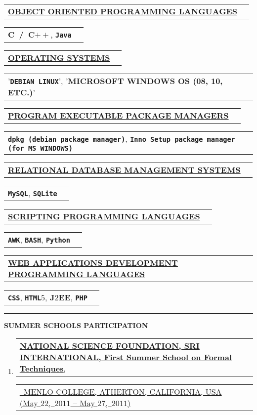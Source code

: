\documentclass[9pt,a4paper]{article} %
\makeatletter
\newcommand{\headerrow}[2]
{\begin{tabular*}{\linewidth}{l@{\extracolsep{\fill}}r}
	#1 &
	#2 \\
\end{tabular*}}
\newcommand{\headerrowONE}[1]{\headerrow{#1}{}}
\newcommand{\cplusplus}{C$++$\xspace}
\newcommand{\java}{\texttt{Java}\xspace}
\newcommand{\css}{\texttt{CSS}\xspace}
\newcommand{\html}{\texttt{HTML$5$}\xspace}
\newcommand{\jtwoee}{J$2$EE\xspace}
\newcommand{\php}{\texttt{PHP}\xspace}
\newcommand{\dpkgmanager}{\texttt{dpkg (debian package manager)}\xspace}
\newcommand{\innosetuppackagemanager}{\texttt{Inno Setup package manager (for MS~WINDOWS)}\xspace}
\newcommand{\AWK}{\texttt{AWK}\xspace}
\newcommand{\bash}{\texttt{BASH}\xspace}
\newcommand{\python}{\texttt{Python}\xspace}
\newcommand{\mysql}{\texttt{MySQL}\xspace}
\newcommand{\sqlite}{\texttt{SQLite}\xspace}
\newcommand{\yerothdebian}{\texttt{DEBIAN LINUX}\xspace}
\newcommand{\cvitemdate}[2]{#1~$#2$\xspace}
\makeatother
\begin{document}
\headerrowONE{\textbf{\underline{OBJECT ORIENTED PROGRAMMING LANGUAGES}}}
\headerrowONE{\textbf{C~/~\cplusplus}, \textbf{\java}}

\vspace{0.3em}


\headerrowONE{\textbf{\underline{OPERATING SYSTEMS}}}
\headerrowONE{'\textbf{\yerothdebian}', '\textbf{MICROSOFT WINDOWS OS (08, 10, ETC.)}'}

\vspace{0.3em}

\headerrowONE{\textbf{\underline{PROGRAM EXECUTABLE PACKAGE MANAGERS}}}
\headerrowONE{\textbf{\dpkgmanager}, \textbf{\innosetuppackagemanager}}

\vspace{0.3em}

\headerrowONE{\textbf{\underline{RELATIONAL DATABASE MANAGEMENT SYSTEMS}}}
\headerrowONE{\textbf{\mysql}, \textbf{\sqlite}}

\vspace{0.3em}

\headerrowONE{\textbf{\underline{SCRIPTING PROGRAMMING LANGUAGES}}}
\headerrowONE{\textbf{\AWK}, \textbf{\bash}, \textbf{\python}}

\vspace{0.3em}

\headerrowONE{\textbf{\underline{WEB APPLICATIONS DEVELOPMENT PROGRAMMING LANGUAGES}}}
\headerrowONE{\textbf{\css}, \textbf{\html}, \textbf{\jtwoee}, \textbf{\php}}

\vspace{1em}

\hrule
\begin{center}
{\large \textbf{SUMMER SCHOOLS PARTICIPATION}}
\end{center}

\vspace{0.5em}

\begin{enumerate}
	\item \headerrowONE{\href{http://fm.csl.sri.com/SSFT11/}{\textbf{NATIONAL SCIENCE FOUNDATION, SRI INTERNATIONAL, First Summer School on Formal Techniques},}}
			\headerrowONE{\href{http://fm.csl.sri.com/SSFT11}{\ \hfill  MENLO COLLEGE, ATHERTON, 
			CALIFORNIA, USA (\cvitemdate{May $22$,}{2011} -- \cvitemdate{May $27$,}{2011})}}

\end{enumerate}

\vspace{1em}
\end{document}
